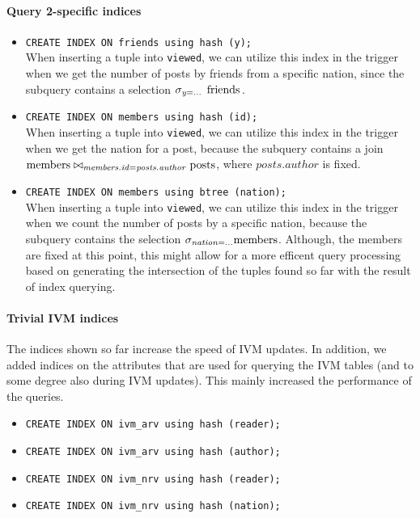 \documentclass[12pt]{article}
\begin{document}
\paragraph{Query 2-specific indices}
\begin{itemize}
    \item \lstinline{CREATE INDEX ON friends using hash (y);} \\
	When inserting a tuple into \lstinline{viewed}, we can utilize this index in the trigger when we get the number of posts by friends from a specific nation, since the subquery contains a selection $\sigma_{\mathit{y} = ...} \mbox{ \lstinline{friends}}$.
    \item \lstinline{CREATE INDEX ON members using hash (id);} \\
    When inserting a tuple into \lstinline{viewed}, we can utilize this index in the trigger when we get the nation for a post, because the subquery contains a join $\mbox{\lstinline{members}} \bowtie_{\mathit{members.id} = \mathit{posts.author}} \mbox{\lstinline{posts}}$, where $\mathit{posts.author}$ is fixed.
    \item \lstinline{CREATE INDEX ON members using btree (nation);} \\
    When inserting a tuple into \lstinline{viewed}, we can utilize this index in the trigger when we count the number of posts by a specific nation, because the subquery contains the selection $\sigma_{\mathit{nation} = \ldots} \mbox{\lstinline{members}}$. Although, the members are fixed at this point, this might allow for a more efficent query processing based on generating the intersection of the tuples found so far with the result of index querying.
\end{itemize}

\paragraph{Trivial IVM indices}
The indices shown so far increase the speed of IVM updates. In addition, we added indices on the attributes that are used for querying the IVM tables (and to some degree also during IVM updates). This mainly increased the performance of the queries.

\begin{itemize}
	\item \lstinline{CREATE INDEX ON ivm_arv using hash (reader);}
    \item \lstinline{CREATE INDEX ON ivm_arv using hash (author);}
    \item \lstinline{CREATE INDEX ON ivm_nrv using hash (reader);}
    \item \lstinline{CREATE INDEX ON ivm_nrv using hash (nation);}
\end{itemize}
\end{document}
